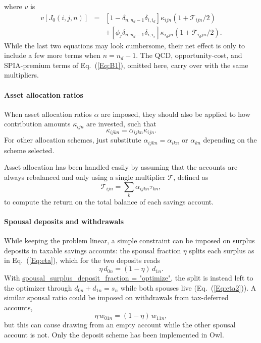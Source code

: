 \documentclass[fleqn,12pt]{report}
\newcommand{\code}[1]{\url{#1}}
\begin{document}
where $v$ is
\begin{eqnarray}
	v[J_0(i, j, n)] 
	&=& [1 - \delta_{n, n_d-1}\delta_{i, i_d}] \kappa_{ijn}(1 + \mathcal{T}_{ijn}/2)
	\nonumber \\
	&& + [\phi_j\delta_{n, n_d-1}\delta_{i, i_s}]\kappa_{i_djn}(1 + \mathcal{T}_{i_djn}/2). 
\end{eqnarray}
While the last two equations may look cumbersome, their net effect is only to include
a few more terms when $n=n_d-1$. 
The QCD, opportunity-cost, and SPIA-premium terms of Eq.~(\ref{Eq:B1}), omitted here, carry
over with the same multipliers.

\paragraph*{Asset allocation ratios}
When asset allocation ratios $\alpha$ are imposed,
they should also be applied to how
contribution amounts $\kappa_{ijn}$ are invested, such that 
\begin{equation}
	\kappa_{ijkn} = \alpha_{ijkn} \kappa_{ijn}.
\end{equation}
For other allocation schemes, just substitute $\alpha_{ijkn} = \alpha_{ikn}$ or $\alpha_{kn}$
depending on the scheme selected.

Asset allocation has been handled easily by assuming that
the accounts are always rebalanced
and only using a single multiplier $\mathcal{T}$, defined as
\begin{equation}
	\mathcal{T}_{ijn} = \sum_k \alpha_{ijkn}\tau_{kn},
\end{equation}
to compute the return
on the total balance of each savings account.

\paragraph*{Spousal deposits and withdrawals}
While keeping the problem linear, a simple constraint can be imposed on
surplus deposits in taxable savings accounts: the spousal fraction $\eta$ splits each
surplus as in Eq.~(\ref{Eq:eta}), which for the two deposits reads
\begin{equation}
	\eta\, d_{0n} = (1 - \eta)\, d_{1n}.
\end{equation}
With \code{spousal_surplus_deposit_fraction = "optimize"}, the split is instead left to the
optimizer through $d_{0n} + d_{1n} = s_n$ while both spouses live (Eq.~(\ref{Eq:eta2})).
A similar spousal ratio could be imposed on withdrawals from tax-deferred accounts,
\begin{equation}
	\eta\, w_{01n} = (1 - \eta)\, w_{11n},
\end{equation}
but this can cause drawing from an empty account while the other spousal account is not.
Only the deposit scheme has been implemented in Owl.
\end{document}
